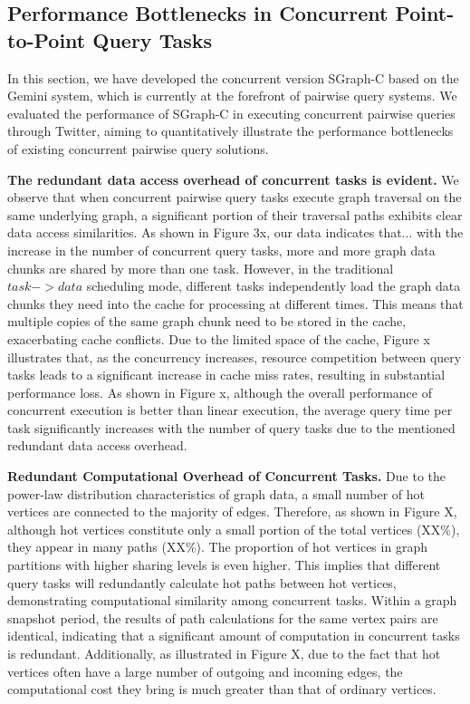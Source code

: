 \documentclass[lettersize,journal]{IEEEtran} %
\begin{document}
\subsection{Performance Bottlenecks in Concurrent Point-to-Point Query Tasks}
In this section, we have developed the concurrent version SGraph-C based on the Gemini system, which is currently at the forefront of pairwise query systems. We evaluated the performance of SGraph-C in executing concurrent pairwise queries through Twitter, aiming to quantitatively illustrate the performance bottlenecks of existing concurrent pairwise query solutions.

{\bf{The redundant data access overhead of concurrent tasks is evident.}} We observe that when concurrent pairwise query tasks execute graph traversal on the same underlying graph, a significant portion of their traversal paths exhibits clear data access similarities. As shown in Figure 3x, our data indicates that... with the increase in the number of concurrent query tasks, more and more graph data chunks are shared by more than one task. However, in the traditional $task->data$ scheduling mode, different tasks independently load the graph data chunks they need into the cache for processing at different times. This means that multiple copies of the same graph chunk need to be stored in the cache, exacerbating cache conflicts. Due to the limited space of the cache, Figure x illustrates that, as the concurrency increases, resource competition between query tasks leads to a significant increase in cache miss rates, resulting in substantial performance loss. As shown in Figure x, although the overall performance of concurrent execution is better than linear execution, the average query time per task significantly increases with the number of query tasks due to the mentioned redundant data access overhead.


{\bf{Redundant Computational Overhead of Concurrent Tasks.}} Due to the power-law distribution characteristics of graph data, a small number of hot vertices are connected to the majority of edges. Therefore, as shown in Figure X, although hot vertices constitute only a small portion of the total vertices (XX\%), they appear in many paths (XX\%). The proportion of hot vertices in graph partitions with higher sharing levels is even higher. This implies that different query tasks will redundantly calculate hot paths between hot vertices, demonstrating computational similarity among concurrent tasks. Within a graph snapshot period, the results of path calculations for the same vertex pairs are identical, indicating that a significant amount of computation in concurrent tasks is redundant. Additionally, as illustrated in Figure X, due to the fact that hot vertices often have a large number of outgoing and incoming edges, the computational cost they bring is much greater than that of ordinary vertices.
\end{document}
